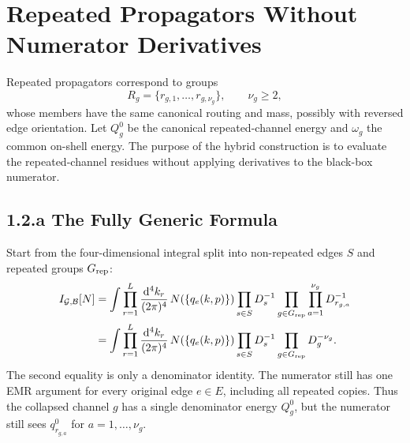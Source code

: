 \documentclass[11pt,a4paper]{report}
\newcommand{\dd}{\mathrm{d}}
\newcommand{\Graph}{\mathcal G}
\newcommand{\Basis}{\mathcal B}
\begin{document}
\section{Repeated Propagators Without Numerator Derivatives}

Repeated propagators correspond to groups
\begin{equation}
  R_g=\{r_{g,1},\ldots,r_{g,\nu_g}\},\qquad \nu_g\ge2,
\end{equation}
whose members have the same canonical routing and mass, possibly with reversed
edge orientation.  Let \(Q_g^0\) be the canonical repeated-channel energy and
\(\omega_g\) the common on-shell energy.  The purpose of the hybrid
construction is to evaluate the repeated-channel residues without applying
derivatives to the black-box numerator.

\subsection*{1.2.a The Fully Generic Formula}

Start from the four-dimensional integral split into non-repeated edges \(S\)
and repeated groups \(G_{\rm rep}\):
\begin{align}
  I_{\Graph,\Basis}[N]
  &=
  \int \prod_{r=1}^{L}\frac{\dd^4 k_r}{(2\pi)^4}\,
  N(\{q_e(k,p)\})
  \prod_{s\in S}D_s^{-1}
  \prod_{g\in G_{\rm rep}}\prod_{a=1}^{\nu_g}D_{r_{g,a}}^{-1}
  \notag\\
  &=
  \int \prod_{r=1}^{L}\frac{\dd^4 k_r}{(2\pi)^4}\,
  N(\{q_e(k,p)\})
  \prod_{s\in S}D_s^{-1}
  \prod_{g\in G_{\rm rep}}D_g^{-\nu_g}.
  \label{eq:collapsed-repeated-integral}
\end{align}
The second equality is only a denominator identity.  The numerator still has
one EMR argument for every original edge \(e\in E\), including all repeated
copies.  Thus the collapsed channel \(g\) has a single denominator energy
\(Q_g^0\), but the numerator still sees \(q_{r_{g,a}}^0\) for
\(a=1,\ldots,\nu_g\).
\end{document}
